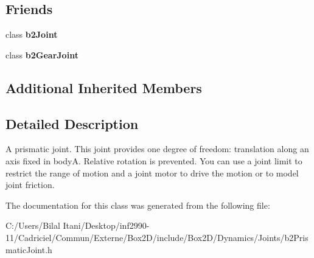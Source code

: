 \subsection*{Friends}
\begin{DoxyCompactItemize}
\item 
class {\bfseries b2\+Joint}\hypertarget{classb2_prismatic_joint_a54ade8ed3d794298108d7f4c4e4793fa}{}\label{classb2_prismatic_joint_a54ade8ed3d794298108d7f4c4e4793fa}

\item 
class {\bfseries b2\+Gear\+Joint}\hypertarget{classb2_prismatic_joint_a13c275221e30bb485e17e4e04553cb71}{}\label{classb2_prismatic_joint_a13c275221e30bb485e17e4e04553cb71}

\end{DoxyCompactItemize}
\subsection*{Additional Inherited Members}


\subsection{Detailed Description}
A prismatic joint. This joint provides one degree of freedom\+: translation along an axis fixed in bodyA. Relative rotation is prevented. You can use a joint limit to restrict the range of motion and a joint motor to drive the motion or to model joint friction. 

The documentation for this class was generated from the following file\+:\begin{DoxyCompactItemize}
\item 
C\+:/\+Users/\+Bilal Itani/\+Desktop/inf2990-\/11/\+Cadriciel/\+Commun/\+Externe/\+Box2\+D/include/\+Box2\+D/\+Dynamics/\+Joints/b2\+Prismatic\+Joint.\+h\end{DoxyCompactItemize}
